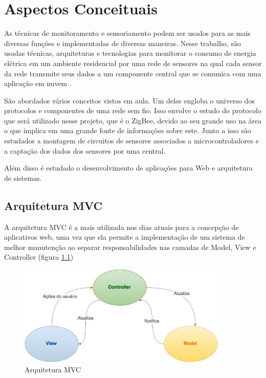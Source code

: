 \chapter{Aspectos Conceituais}
\label{Cap:conceitos}

As técnicas de monitoramento e sensoriamento podem ser usados para as mais diversas funções e implementadas de diversas maneiras. Nesse trabalho, são usadas técnicas, arquiteturas e tecnologias para monitorar o consumo de energia elétrica em um ambiente residencial por uma rede de sensores na qual cada sensor da rede transmite seus dados a um componente central que se comunica com uma aplicação em nuvem  \cite{low_cost_wireless_sensor_network_SMF_master_thesis}.

São abordados vários conceitos vistos em aula. Um deles engloba o universo dos protocolos e componentes de uma rede sem fio. Isso envolve o estudo do protocolo que será utilizado nesse projeto, que é o ZigBee, devido ao seu grande uso na área o que implica em uma grande fonte de informações sobre este\cite{xbee_book}\cite{sensor_network_book}\cite{low_cost_wireless_sensor_network_SMF_master_thesis}. Junto a isso são estudados a montagem de circuitos de sensores associados a microcontroladores e a captação dos dados dos sensores por uma central.

Além disso é estudado o desenvolvimento de aplicações para Web e arquitetura de sistemas.




\section{Arquitetura MVC }
\label{Sec:MVC}

A arquitetura MVC é a mais utilizada nos dias atuais para a concepção de aplicativos web, uma vez que ela permite a implementação de um sistema de melhor manutenção ao separar responsabilidades nas camadas de Model, View e Controller \cite{MVC_design} (figura \ref{fig:mvc})

\begin{figure}
\centering
\includegraphics[width=10cm,keepaspectratio]{figuras/MVC.jpg}
\caption{\label{fig:mvc} Arquitetura MVC}
\end{figure}

